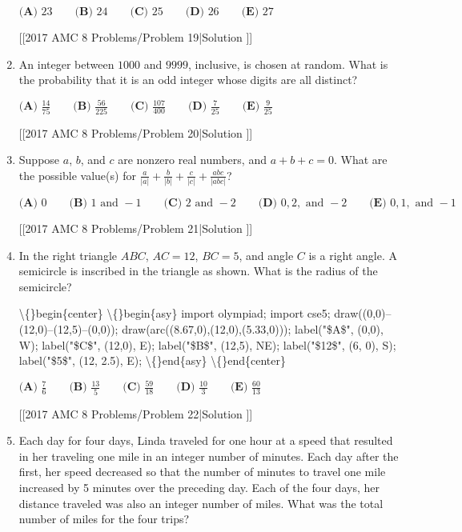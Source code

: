 \documentclass{article}
\begin{document}
\begin{enumerate}[label=\arabic*., itemsep=0.5em]
\(\textbf{(A) }23\qquad\textbf{(B) }24\qquad\textbf{(C) }25\qquad\textbf{(D) }26\qquad\textbf{(E) }27\)

[[2017 AMC 8 Problems/Problem 19|Solution
]]\par \vspace{0.5em}\item An integer between \(1000\) and \(9999\), inclusive, is chosen at random. What is the probability that it is an odd integer whose digits are all distinct?

\(\textbf{(A) }\frac{14}{75}\qquad\textbf{(B) }\frac{56}{225}\qquad\textbf{(C) }\frac{107}{400}\qquad\textbf{(D) }\frac{7}{25}\qquad\textbf{(E) }\frac{9}{25}\)

[[2017 AMC 8 Problems/Problem 20|Solution
]]\par \vspace{0.5em}\item Suppose \(a\), \(b\), and \(c\) are nonzero real numbers, and \(a+b+c=0\). What are the possible value(s) for \(\frac{a}{|a|}+\frac{b}{|b|}+\frac{c}{|c|}+\frac{abc}{|abc|}\)?

\(\textbf{(A) }0\qquad\textbf{(B) }1\text{ and }-1\qquad\textbf{(C) }2\text{ and }-2\qquad\textbf{(D) }0,2,\text{ and }-2\qquad\textbf{(E) }0,1,\text{ and }-1\)

[[2017 AMC 8 Problems/Problem 21|Solution
]]\par \vspace{0.5em}\item In the right triangle \(ABC\), \(AC=12\), \(BC=5\), and angle \(C\) is a right angle. A semicircle is inscribed in the triangle as shown. What is the radius of the semicircle?

\textbackslash\{\}begin\{center\}
\textbackslash\{\}begin\{asy\}
import olympiad;
import cse5;
draw((0,0)--(12,0)--(12,5)--(0,0));
draw(arc((8.67,0),(12,0),(5.33,0)));
label("\$A\$", (0,0), W);
label("\$C\$", (12,0), E);
label("\$B\$", (12,5), NE);
label("\$12\$", (6, 0), S);
label("\$5\$", (12, 2.5), E);
\textbackslash\{\}end\{asy\}
\textbackslash\{\}end\{center\}


\(\textbf{(A) }\frac{7}{6}\qquad\textbf{(B) }\frac{13}{5}\qquad\textbf{(C) }\frac{59}{18}\qquad\textbf{(D) }\frac{10}{3}\qquad\textbf{(E) }\frac{60}{13}\)

[[2017 AMC 8 Problems/Problem 22|Solution
]]\par \vspace{0.5em}\item Each day for four days, Linda traveled for one hour at a speed that resulted in her traveling one mile in an integer number of minutes. Each day after the first, her speed decreased so that the number of minutes to travel one mile increased by 5 minutes over the preceding day. Each of the four days, her distance traveled was also an integer number of miles. What was the total number of miles for the four trips?


\end{enumerate}
\end{document}
